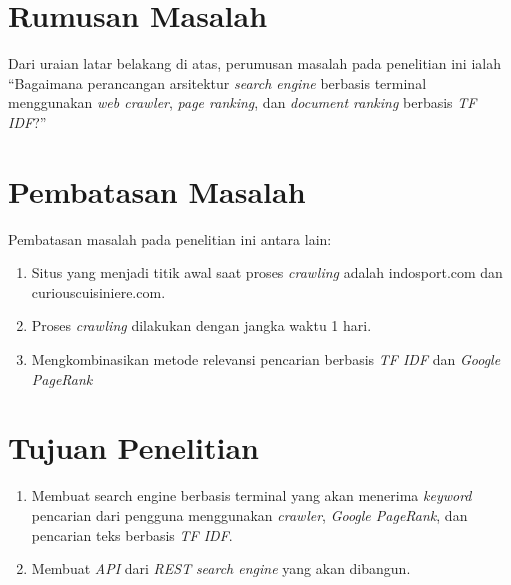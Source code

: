 \section{Rumusan Masalah}
Dari uraian latar belakang di atas, perumusan masalah pada penelitian ini ialah “Bagaimana perancangan arsitektur \textit{search engine} berbasis terminal menggunakan \textit{web crawler}, \textit{page ranking}, dan \textit{document ranking} berbasis \textit{TF IDF}?”

\section{Pembatasan Masalah}
Pembatasan masalah pada penelitian ini antara lain:
\begin{enumerate}
	\item Situs yang menjadi titik awal saat proses \textit{crawling} adalah indosport.com dan curiouscuisiniere.com.
	\item Proses \textit{crawling} dilakukan dengan jangka waktu 1 hari.
	\item Mengkombinasikan metode relevansi pencarian berbasis \textit{TF IDF} dan \textit{Google PageRank}
\end{enumerate}

\section{Tujuan Penelitian}
\begin{enumerate}
	\item Membuat search engine berbasis terminal yang akan menerima \textit{keyword} pencarian dari pengguna menggunakan \textit{crawler}, \textit{Google PageRank}, dan pencarian teks berbasis \textit{TF IDF}.
	\item Membuat \textit{API} dari \textit{REST} \textit{search engine} yang akan dibangun.
\end{enumerate}

